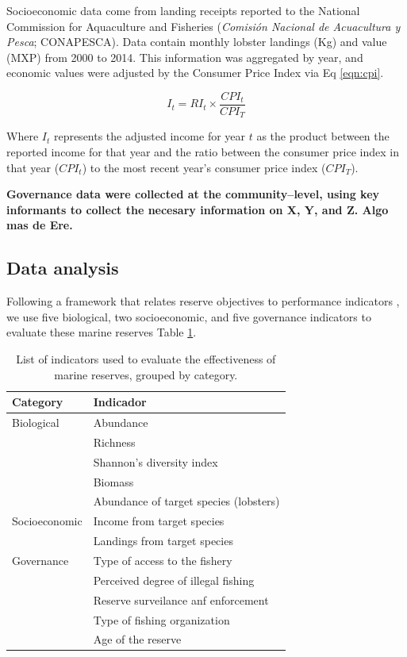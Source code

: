 \documentclass{frontiersSCNS}
\theoremstyle{definition}
\theoremstyle{definition}
\theoremstyle{definition}
\theoremstyle{remark}
\begin{document}
Socioeconomic data come from landing receipts reported to the National
Commission for Aquaculture and Fisheries (\emph{Comisión Nacional de
Acuacultura y Pesca}; CONAPESCA). Data contain monthly lobster landings
(Kg) and value (MXP) from 2000 to 2014. This information was aggregated
by year, and economic values were adjusted by the Consumer Price Index
\citep{oecd_2017-VV} via Eq \ref{eqn:cpi}.

\begin{equation}
I_t = RI_t\times\frac{CPI_t}{CPI_T}
\label{eqn:cpi}
\end{equation}

Where \(I_t\) represents the adjusted income for year \(t\) as the
product between the reported income for that year and the ratio between
the consumer price index in that year (\(CPI_t\)) to the most recent
year's consumer price index (\(CPI_T\)).

\textbf{Governance data were collected at the community--level, using
key informants to collect the necesary information on X, Y, and Z. Algo
mas de Ere.}

\subsection{Data analysis}\label{data-analysis}

Following a framework that relates reserve objectives to performance
indicators \citep{Villasenor-Derbez_2018}, we use five biological, two
socioeconomic, and five governance indicators to evaluate these marine
reserves Table \ref{table:indicators}.

\begin{table}[H]

\caption{\label{tab:unnamed-chunk-2}\label{table:indicators}List of indicators used to evaluate the effectiveness of marine reserves, grouped by category.}
\centering
\begin{tabular}[t]{l|l}
\hline
Category & Indicador\\
\hline
Biological & Abundance\\
\hline
 & Richness\\
\hline
 & Shannon's diversity index\\
\hline
 & Biomass\\
\hline
 & Abundance of target species (lobsters)\\
\hline
Socioeconomic & Income from target species\\
\hline
 & Landings from target species\\
\hline
Governance & Type of access to the fishery\\
\hline
 & Perceived degree of illegal fishing\\
\hline
 & Reserve surveilance anf enforcement\\
\hline
 & Type of fishing organization\\
\hline
 & Age of the reserve\\
\hline
\end{tabular}
\end{table}
\end{document}
